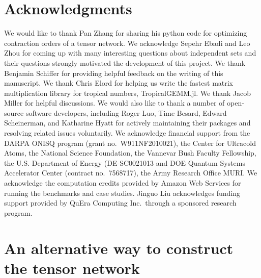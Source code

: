 \documentclass[onefignum, onetabnum]{siamart190516}
\newcommand{\<}{\langle}
\renewcommand{\>}{\rangle}
\begin{document}
\section*{Acknowledgments}
We would like to thank Pan Zhang for sharing his python code for optimizing contraction orders of a tensor network.
We acknowledge Sepehr Ebadi and Leo Zhou for coming up with many interesting questions about independent sets and their questions strongly motivated the development of this project.
We thank Benjamin Schiffer for providing helpful feedback on the writing of this manuscript.
We thank Chris Elord for helping us write the fastest matrix multiplication library for tropical numbers, TropicalGEMM.jl. 
We thank Jacob Miller for helpful discussions. 
We would also like to thank a number of open-source software developers, including Roger Luo, Time Besard, Edward Scheinerman, and Katharine Hyatt
for actively maintaining their packages and resolving related issues voluntarily.
We acknowledge financial support from the DARPA ONISQ program (grant no.\ W911NF2010021), the Center for Ultracold Atoms, the National Science Foundation, the Vannevar Bush Faculty Fellowship, the U.S. Department of Energy (DE-SC0021013 and DOE Quantum Systems Accelerator Center (contract no.\ 7568717), 
the Army Research Office MURI. We acknowledge the computation credits provided by Amazon Web Services for running the benchmarks and case studies. Jinguo Liu acknowledges funding support provided by QuEra Computing Inc.\ through a sponsored research program.




\appendix

\section{An alternative way to construct the tensor network}\label{sec:energymodel}
\end{document}
